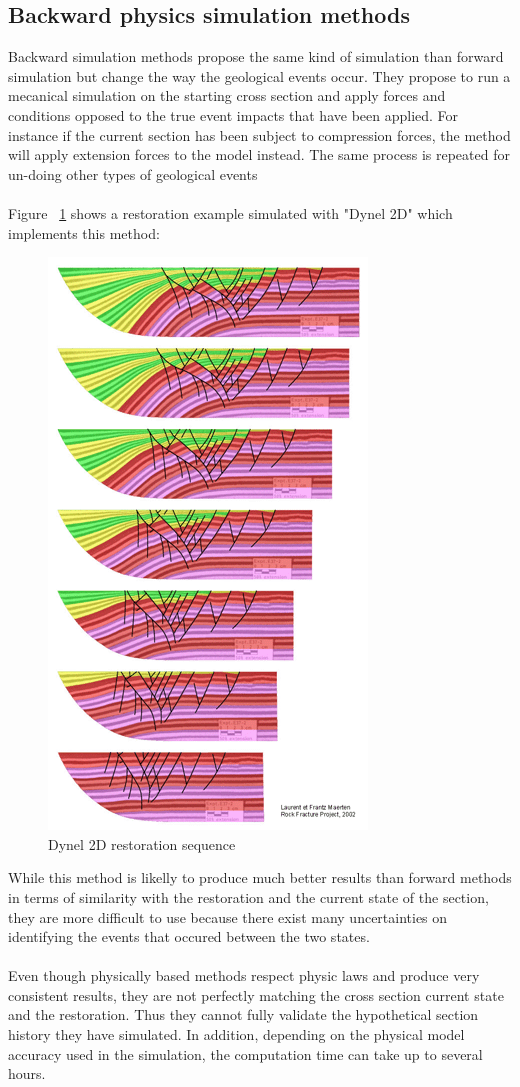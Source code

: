 \documentclass[12pt, a4paper]{report} %
\begin{document}
\subsection{Backward physics simulation methods}
Backward simulation methods propose the same kind of simulation than forward simulation but change the way the geological events occur. They propose to run a mecanical simulation on the starting cross section and apply forces and conditions opposed to the true event impacts that have been applied. For instance if the current section has been subject to compression forces, the method will apply extension forces to the model instead. The same process is repeated for un-doing other types of geological events\\\\
 Figure ~\ref{dyn2} shows a restoration example simulated with "Dynel 2D" \cite{Dynel} which implements this method:
 \begin{figure}[H]
	\centering
	\includegraphics[scale=0.6]{dynel2D.png}
	\caption{Dynel 2D restoration sequence}
	\label{dyn2}
\end{figure}
While this method is likelly to produce much better results than forward methods in terms of similarity with the restoration and the current state of the section, they are more difficult to use because there exist many uncertainties on identifying the events that occured between the two states.\\\\
Even though physically based methods respect physic laws and produce very consistent results, they are not perfectly matching the cross section current state and the restoration. Thus they cannot fully validate the hypothetical section history they have simulated. In addition, depending on the physical model accuracy used in the simulation, the computation time can take up to several hours.
\end{document}
